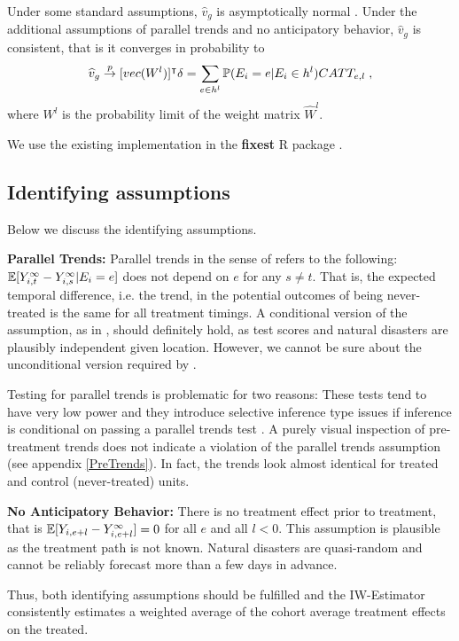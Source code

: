 Under some standard assumptions, $\widehat{v}_g$ is asymptotically normal \citep[for a proof and a detailed description of said assumptions see][Appendix C]{Sun_2021}. Under the additional assumptions of parallel trends and no anticipatory behavior, $\widehat{v}_g$ is consistent, that is it converges in probability to
\begin{align*}
	\widehat{v}_g \overset{p}{\to} [vec(W^{l})]^\intercal \delta = \sum_{e \in h^{l}} \mathbb{P}(E_i = e | E_i \in h^{l}) CATT_{e, l} \; ,
\end{align*}
where $W^{l}$ is the probability limit of the weight matrix $\widehat{W}^l$.


We use the existing implementation in the \textbf{fixest} R package \citep{Berge_2018}.

\subsection{Identifying assumptions}

Below we discuss the identifying assumptions.

\textbf{Parallel Trends:} Parallel trends in the sense of \cite{Sun_2021} refers to the following: $\mathbb{E}[Y_{i, t}^{\infty} - Y_{i, s}^{\infty} | E_i = e]$ does not depend on $e$ for any $s \neq t$. That is, the expected temporal difference, i.e. the trend, in the potential outcomes of being never-treated is the same for all treatment timings. A conditional version of the assumption, as in \cite{Callaway_2021}, should definitely hold, as test scores and natural disasters are plausibly independent given location. However, we cannot be sure about the unconditional version required by \cite{Sun_2021}.

Testing for parallel trends is problematic for two reasons: These tests tend to have very low power and they introduce selective inference type issues if inference is conditional on passing a parallel trends test \citep{Rambachan_2019}. A purely visual inspection of pre-treatment trends does not indicate a violation of the parallel trends assumption (see appendix \ref{PreTrends}). In fact, the trends look almost identical for treated and control (never-treated) units.

\textbf{No Anticipatory Behavior:} There is no treatment effect prior to treatment, that is $\mathbb{E}[Y_{i, e+l} - Y_{i, e+l}^{\infty}] = 0$ for all $e$ and all $l < 0$. This assumption is plausible as the treatment path is not known. Natural disasters are quasi-random and cannot be reliably forecast more than a few days in advance.

Thus, both identifying assumptions should be fulfilled and the IW-Estimator consistently estimates a weighted average of the cohort average treatment effects on the treated.




